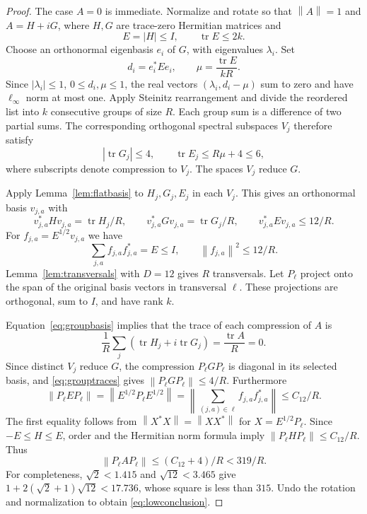 \documentclass[11pt]{article}
\theoremstyle{remark}
\newcommand{\tr}{\operatorname{tr}}
\newcommand{\norm}[1]{\left\lVert#1\right\rVert}
\numberwithin{equation}{section}
\begin{document}
\begin{proof}
The case $A=0$ is immediate. Normalize and rotate so that
$\norm A=1$ and $A=H+iG$, where $H,G$ are trace-zero Hermitian matrices and
\[
 E=|H|\le I,\qquad \tr E\le2k.
\]
Choose an orthonormal eigenbasis $e_i$ of $G$, with eigenvalues $\lambda_i$.
Set
\[
 d_i=e_i^*Ee_i,\qquad \mu=\frac{\tr E}{kR}.
\]
Since $|\lambda_i|\le1$, $0\le d_i,\mu\le1$, the real vectors
$(\lambda_i,d_i-\mu)$ sum to zero and have $\ell_\infty$ norm at most one.
Apply Steinitz rearrangement and divide the reordered list into $k$ consecutive
groups of size $R$. Each group sum is a difference of two partial sums. The
corresponding orthogonal spectral subspaces $V_j$ therefore satisfy
\begin{equation}\label{eq:grouptraces}
 |\tr G_j|\le4,\qquad \tr E_j\le R\mu+4\le6,
\end{equation}
where subscripts denote compression to $V_j$. The spaces $V_j$ reduce $G$.

Apply Lemma~\ref{lem:flatbasis} to $H_j,G_j,E_j$ in each $V_j$. This gives an
orthonormal basis $v_{j,a}$ with
\begin{equation}\label{eq:groupbasis}
 v_{j,a}^*Hv_{j,a}=\tr H_j/R,\qquad
 v_{j,a}^*Gv_{j,a}=\tr G_j/R,\qquad
 v_{j,a}^*Ev_{j,a}\le12/R.
\end{equation}
For $f_{j,a}=E^{1/2}v_{j,a}$ we have
\[
 \sum_{j,a}f_{j,a}f_{j,a}^*=E\le I,\qquad \norm{f_{j,a}}^2\le12/R.
\]
Lemma~\ref{lem:transversals} with $D=12$ gives $R$ transversals. Let $P_\ell$
project onto the span of the original basis vectors in transversal $\ell$.
These projections are orthogonal, sum to $I$, and have rank $k$.

Equation~\eqref{eq:groupbasis} implies that the trace of each compression of
$A$ is
\[
 \frac1R\sum_j(\tr H_j+i\tr G_j)=\frac{\tr A}{R}=0.
\]
Since distinct $V_j$ reduce $G$, the compression $P_\ell GP_\ell$ is diagonal
in its selected basis, and \eqref{eq:grouptraces} gives
$\norm{P_\ell GP_\ell}\le4/R$. Furthermore
\[
 \norm{P_\ell EP_\ell}
 =\norm{E^{1/2}P_\ell E^{1/2}}
 =\norm{\sum_{(j,a)\in\ell}f_{j,a}f_{j,a}^*}\le C_{12}/R.
\]
The first equality follows from $\norm{X^*X}=\norm{XX^*}$ for
$X=E^{1/2}P_\ell$. Since $-E\le H\le E$, order and the Hermitian norm formula
imply $\norm{P_\ell HP_\ell}\le C_{12}/R$. Thus
\[
 \norm{P_\ell AP_\ell}\le(C_{12}+4)/R<319/R.
\]
For completeness, $\sqrt2<1.415$ and $\sqrt{12}<3.465$ give
$1+2(\sqrt2+1)\sqrt{12}<17.736$, whose square is less than $315$.
Undo the rotation and normalization to obtain \eqref{eq:lowconclusion}.
\end{proof}
\end{document}
